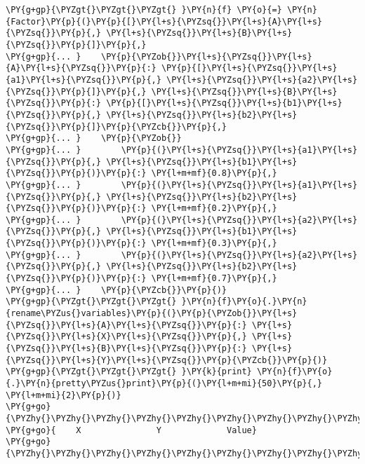 \begin{fulllineitems}
\begin{fulllineitems}
\begin{Verbatim}[commandchars=\\\{\}]
\PY{g+gp}{\PYZgt{}\PYZgt{}\PYZgt{} }\PY{n}{f} \PY{o}{=} \PY{n}{Factor}\PY{p}{(}\PY{p}{[}\PY{l+s}{\PYZsq{}}\PY{l+s}{A}\PY{l+s}{\PYZsq{}}\PY{p}{,} \PY{l+s}{\PYZsq{}}\PY{l+s}{B}\PY{l+s}{\PYZsq{}}\PY{p}{]}\PY{p}{,}
\PY{g+gp}{... }    \PY{p}{\PYZob{}}\PY{l+s}{\PYZsq{}}\PY{l+s}{A}\PY{l+s}{\PYZsq{}}\PY{p}{:} \PY{p}{[}\PY{l+s}{\PYZsq{}}\PY{l+s}{a1}\PY{l+s}{\PYZsq{}}\PY{p}{,} \PY{l+s}{\PYZsq{}}\PY{l+s}{a2}\PY{l+s}{\PYZsq{}}\PY{p}{]}\PY{p}{,} \PY{l+s}{\PYZsq{}}\PY{l+s}{B}\PY{l+s}{\PYZsq{}}\PY{p}{:} \PY{p}{[}\PY{l+s}{\PYZsq{}}\PY{l+s}{b1}\PY{l+s}{\PYZsq{}}\PY{p}{,} \PY{l+s}{\PYZsq{}}\PY{l+s}{b2}\PY{l+s}{\PYZsq{}}\PY{p}{]}\PY{p}{\PYZcb{}}\PY{p}{,}
\PY{g+gp}{... }    \PY{p}{\PYZob{}}
\PY{g+gp}{... }        \PY{p}{(}\PY{l+s}{\PYZsq{}}\PY{l+s}{a1}\PY{l+s}{\PYZsq{}}\PY{p}{,} \PY{l+s}{\PYZsq{}}\PY{l+s}{b1}\PY{l+s}{\PYZsq{}}\PY{p}{)}\PY{p}{:} \PY{l+m+mf}{0.8}\PY{p}{,}
\PY{g+gp}{... }        \PY{p}{(}\PY{l+s}{\PYZsq{}}\PY{l+s}{a1}\PY{l+s}{\PYZsq{}}\PY{p}{,} \PY{l+s}{\PYZsq{}}\PY{l+s}{b2}\PY{l+s}{\PYZsq{}}\PY{p}{)}\PY{p}{:} \PY{l+m+mf}{0.2}\PY{p}{,}
\PY{g+gp}{... }        \PY{p}{(}\PY{l+s}{\PYZsq{}}\PY{l+s}{a2}\PY{l+s}{\PYZsq{}}\PY{p}{,} \PY{l+s}{\PYZsq{}}\PY{l+s}{b1}\PY{l+s}{\PYZsq{}}\PY{p}{)}\PY{p}{:} \PY{l+m+mf}{0.3}\PY{p}{,}
\PY{g+gp}{... }        \PY{p}{(}\PY{l+s}{\PYZsq{}}\PY{l+s}{a2}\PY{l+s}{\PYZsq{}}\PY{p}{,} \PY{l+s}{\PYZsq{}}\PY{l+s}{b2}\PY{l+s}{\PYZsq{}}\PY{p}{)}\PY{p}{:} \PY{l+m+mf}{0.7}\PY{p}{,}
\PY{g+gp}{... }    \PY{p}{\PYZcb{}}\PY{p}{)}
\PY{g+gp}{\PYZgt{}\PYZgt{}\PYZgt{} }\PY{n}{f}\PY{o}{.}\PY{n}{rename\PYZus{}variables}\PY{p}{(}\PY{p}{\PYZob{}}\PY{l+s}{\PYZsq{}}\PY{l+s}{A}\PY{l+s}{\PYZsq{}}\PY{p}{:} \PY{l+s}{\PYZsq{}}\PY{l+s}{X}\PY{l+s}{\PYZsq{}}\PY{p}{,} \PY{l+s}{\PYZsq{}}\PY{l+s}{B}\PY{l+s}{\PYZsq{}}\PY{p}{:} \PY{l+s}{\PYZsq{}}\PY{l+s}{Y}\PY{l+s}{\PYZsq{}}\PY{p}{\PYZcb{}}\PY{p}{)}
\PY{g+gp}{\PYZgt{}\PYZgt{}\PYZgt{} }\PY{k}{print} \PY{n}{f}\PY{o}{.}\PY{n}{pretty\PYZus{}print}\PY{p}{(}\PY{l+m+mi}{50}\PY{p}{,} \PY{l+m+mi}{2}\PY{p}{)}
\PY{g+go}{\PYZhy{}\PYZhy{}\PYZhy{}\PYZhy{}\PYZhy{}\PYZhy{}\PYZhy{}\PYZhy{}\PYZhy{}\PYZhy{}\PYZhy{}\PYZhy{}\PYZhy{}\PYZhy{}\PYZhy{}\PYZhy{}\PYZhy{}\PYZhy{}\PYZhy{}\PYZhy{}\PYZhy{}\PYZhy{}\PYZhy{}\PYZhy{}\PYZhy{}\PYZhy{}\PYZhy{}\PYZhy{}\PYZhy{}\PYZhy{}\PYZhy{}\PYZhy{}\PYZhy{}\PYZhy{}\PYZhy{}\PYZhy{}\PYZhy{}\PYZhy{}\PYZhy{}\PYZhy{}\PYZhy{}\PYZhy{}\PYZhy{}\PYZhy{}\PYZhy{}\PYZhy{}\PYZhy{}\PYZhy{}\PYZhy{}\PYZhy{}}
\PY{g+go}{    X               Y             Value}
\PY{g+go}{\PYZhy{}\PYZhy{}\PYZhy{}\PYZhy{}\PYZhy{}\PYZhy{}\PYZhy{}\PYZhy{}\PYZhy{}\PYZhy{}\PYZhy{}\PYZhy{}\PYZhy{}\PYZhy{}\PYZhy{}\PYZhy{}\PYZhy{}\PYZhy{}\PYZhy{}\PYZhy{}\PYZhy{}\PYZhy{}\PYZhy{}\PYZhy{}\PYZhy{}\PYZhy{}\PYZhy{}\PYZhy{}\PYZhy{}\PYZhy{}\PYZhy{}\PYZhy{}\PYZhy{}\PYZhy{}\PYZhy{}\PYZhy{}\PYZhy{}\PYZhy{}\PYZhy{}\PYZhy{}\PYZhy{}\PYZhy{}\PYZhy{}\PYZhy{}\PYZhy{}\PYZhy{}\PYZhy{}\PYZhy{}\PYZhy{}\PYZhy{}}

\end{Verbatim}
\end{fulllineitems}
\end{fulllineitems}
